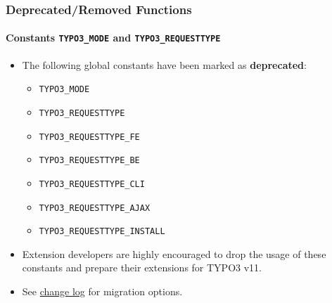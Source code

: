 %

\begin{frame}[fragile]
	\frametitle{Deprecated/Removed Functions}
	\framesubtitle{Constants \texttt{TYPO3\_MODE} and \texttt{TYPO3\_REQUESTTYPE}}

	\begin{itemize}
		\item The following global constants have been marked as \textbf{deprecated}:
			\begin{itemize}\small
				\item \texttt{TYPO3\_MODE}
				\item \texttt{TYPO3\_REQUESTTYPE}
				\item \texttt{TYPO3\_REQUESTTYPE\_FE}
				\item \texttt{TYPO3\_REQUESTTYPE\_BE}
				\item \texttt{TYPO3\_REQUESTTYPE\_CLI}
				\item \texttt{TYPO3\_REQUESTTYPE\_AJAX}
				\item \texttt{TYPO3\_REQUESTTYPE\_INSTALL}
			\end{itemize}\normalsize

		\item Extension developers are highly encouraged to drop the usage of
			these constants and prepare their extensions for TYPO3 v11.
		\item See \href{https://docs.typo3.org/c/typo3/cms-core/master/en-us/Changelog/11.0/Deprecation-92947-DeprecateTYPO3_MODEAndTYPO3_REQUESTTYPEConstants.html}{change log}
			for migration options.
	\end{itemize}

\end{frame}

